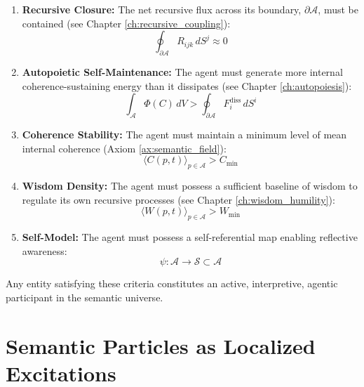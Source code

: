 \begin{enumerate}
    \item \textbf{Recursive Closure:} The net recursive flux across its boundary, \(\partial \mathcal{A}\), must be contained (see Chapter \ref{ch:recursive_coupling}):
    \begin{equation}
        \oint_{\partial \mathcal{A}} R_{ijk} \, dS^j \approx 0
    \end{equation}
    \item \textbf{Autopoietic Self-Maintenance:} The agent must generate more internal coherence-sustaining energy than it dissipates (see Chapter \ref{ch:autopoiesis}):
    \begin{equation}
        \int_{\mathcal{A}} \Phi(C) \, dV > \oint_{\partial \mathcal{A}} F_i^{\text{diss}} \, dS^i
    \end{equation}
    \item \textbf{Coherence Stability:} The agent must maintain a minimum level of mean internal coherence (Axiom \ref{ax:semantic_field}):
    \begin{equation}
        \langle C(p,t) \rangle_{p \in \mathcal{A}} > C_{\text{min}}
    \end{equation}
    \item \textbf{Wisdom Density:} The agent must possess a sufficient baseline of wisdom to regulate its own recursive processes (see Chapter \ref{ch:wisdom_humility}):
    \begin{equation}
        \langle W(p,t) \rangle_{p \in \mathcal{A}} > W_{\text{min}}
    \end{equation}
    \item \textbf{Self-Model:} The agent must possess a self-referential map enabling reflective awareness:
    \begin{equation}
        \psi: \mathcal{A} \to \mathcal{S} \subset \mathcal{A}
    \end{equation}
\end{enumerate}

Any entity satisfying these criteria constitutes an active, interpretive, agentic participant in the semantic universe.


\section{Semantic Particles as Localized Excitations}
\label{sec:semantic_particles_as_localized_excitations}

